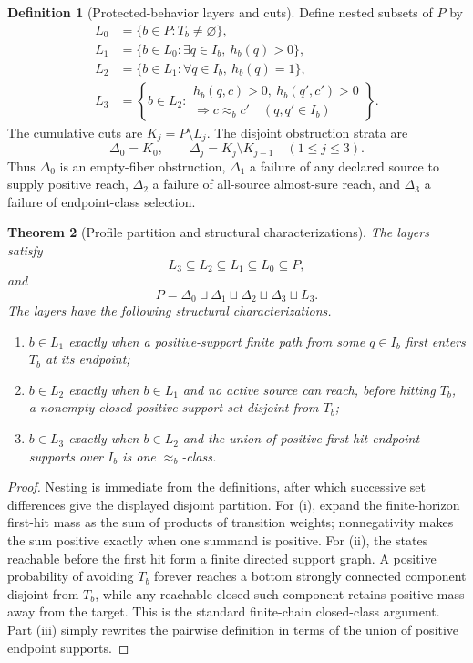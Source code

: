 \documentclass[11pt]{article}
\newtheorem{theorem}{Theorem}[section]
\theoremstyle{definition}
\newtheorem{definition}[theorem]{Definition}
\theoremstyle{remark}
\numberwithin{equation}{section}
\begin{document}
\begin{definition}[Protected-behavior layers and cuts]
Define nested subsets of $P$ by
\begin{align*}
 L_0&=\{b\in P:T_b\ne\varnothing\},\\
 L_1&=\{b\in L_0:\exists q\in I_b,\ h_b(q)>0\},\\
 L_2&=\{b\in L_1:\forall q\in I_b,\ h_b(q)=1\},\\
 L_3&=\left\{b\in L_2:
   \begin{array}{l}
   h_b(q,c)>0,\ h_b(q',c')>0\\[-2pt]
   \Longrightarrow c\approx_b c'
   \quad(q,q'\in I_b)
   \end{array}\right\}.
\end{align*}
The cumulative cuts are $K_j=P\setminus L_j$.  The disjoint obstruction
strata are
\[
 \Delta_0=K_0,\qquad
 \Delta_j=K_j\setminus K_{j-1}\quad(1\leq j\leq3).
\]
Thus $\Delta_0$ is an empty-fiber obstruction, $\Delta_1$ a failure of any
declared source to supply positive reach, $\Delta_2$ a failure of all-source
almost-sure reach, and $\Delta_3$ a failure of endpoint-class selection.
\end{definition}

\begin{theorem}[Profile partition and structural characterizations]
\label{thm:protected-profile}
The layers satisfy
\[
 L_3\subseteq L_2\subseteq L_1\subseteq L_0\subseteq P,
\]
and
\[
 P=\Delta_0\sqcup\Delta_1\sqcup\Delta_2\sqcup\Delta_3\sqcup L_3.
\]
The layers have the following structural characterizations.
\begin{enumerate}[label=(\roman*)]
\item $b\in L_1$ exactly when a positive-support finite path from some
      $q\in I_b$ first enters $T_b$ at its endpoint;
\item $b\in L_2$ exactly when $b\in L_1$ and no active source can reach,
      before hitting $T_b$, a nonempty closed positive-support set disjoint
      from $T_b$;
\item $b\in L_3$ exactly when $b\in L_2$ and the union of positive first-hit
      endpoint supports over $I_b$ is one $\approx_b$-class.
\end{enumerate}
\end{theorem}

\begin{proof}
Nesting is immediate from the definitions, after which successive set
differences give the displayed disjoint partition.  For (i), expand the
finite-horizon first-hit mass as the sum of products of transition weights;
nonnegativity makes the sum positive exactly when one summand is positive.
For (ii), the states reachable before the first hit form a finite directed
support graph.  A positive probability of avoiding $T_b$ forever reaches a
bottom strongly connected component disjoint from $T_b$, while any reachable
closed such component retains positive mass away from the target.  This is the
standard finite-chain closed-class argument.  Part (iii) simply rewrites the
pairwise definition in terms of the union of positive endpoint supports.
\end{proof}
\end{document}
